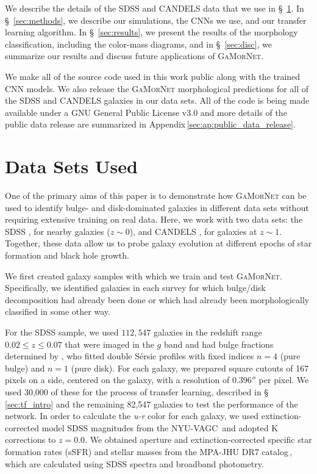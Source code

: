 \documentclass[twocolumn]{aastex63}
\newcommand\sersic{S\'ersic}
\newcommand\gamornet{G\textsc{a}M\textsc{or}N\textsc{et}}
\begin{document}
We describe the details of the SDSS and CANDELS data that we use in \S~\ref{sec:data}. In \S~\ref{sec:methods}, we describe our simulations, the CNNs we use, and our transfer learning algorithm. In \S~\ref{sec:results}, we present the results of the morphology classification, including the color-mass diagrams, and in \S~\ref{sec:disc}, we summarize our results and discuss future applications of \gamornet{}.

We make all of the source code used in this work public along with the trained CNN models. We also release the \gamornet{} morphological predictions for all of the SDSS and CANDELS galaxies in our data sets. All of the code is being made available under a GNU General Public License v3.0 and more details of the public data release are summarized in Appendix\,\ref{sec:ap:public_data_release}. 

\section{Data Sets Used} \label{sec:data}

One of the primary aims of this paper is to demonstrate how \gamornet{} can be used to identify bulge- and disk-dominated galaxies in different data sets without requiring extensive training on real data. Here, we work with two data sets: the SDSS \citep{sdss_tech_summary}, for nearby galaxies ($z\sim0$), and CANDELS \citep{candels_1,candels_2}, for galaxies at $z\sim1$. Together, these data allow us to probe galaxy evolution at different epochs of star formation and black hole growth.

We first created galaxy samples with which we train and test \gamornet{}. Specifically, we identified galaxies in each survey for which bulge/disk decomposition had already been done or which had already been morphologically classified in some other way. 

For the SDSS sample, we used $112,547$ galaxies in the redshift range $ 0.02 \leq z \leq 0.07$ that were imaged in the $g$ band and had bulge fractions determined by \citet{simard_11}, who fitted double \sersic{} profiles with fixed indices $n = 4$ (pure bulge) and $n=1$ (pure disk). For each galaxy, we prepared square cutouts of 167 pixels on a side, centered on the galaxy, with a resolution of $0.396''$ per pixel. We used 30,000 of these for the process of transfer learning, described in \S\,\ref{sec:tf_intro} and the remaining 82,547 galaxies to test the performance of the network. In order to calculate the \textit{u-r} color for each galaxy, we used extinction-corrected model SDSS magnitudes from the NYU-VAGC\,\citep{nyu_vagc_des} and adopted K corrections to $z=0.0$. We obtained aperture and extinction-corrected specific star formation rates (sSFR) and stellar masses from the MPA-JHU DR7 catalog\,\citep{mpa_jhu_2,mpa_jhu_1}, which are calculated using SDSS spectra and broadband photometry. 
\end{document}
